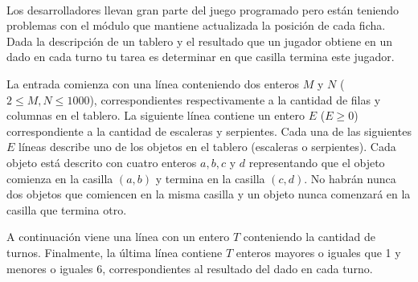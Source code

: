 \documentclass{oci}
\begin{document}
\begin{problemDescription}
  \begin{center}
    ~
  \end{center}

  Los desarrolladores llevan gran parte del juego programado pero están teniendo
  problemas con el módulo que mantiene actualizada la posición de cada ficha.
  Dada la descripción de un tablero y el resultado que un jugador obtiene en un
  dado en cada turno tu tarea es determinar en que casilla termina este jugador.
\end{problemDescription}

\begin{inputDescription}
  La entrada comienza con una línea conteniendo dos enteros $M$ y $N$ ($2 \leq
  M, N \leq 1000$), correspondientes respectivamente a la cantidad de filas y
  columnas en el tablero.
  La siguiente línea contiene un entero $E$ ($E \geq 0$) correspondiente a la
  cantidad de escaleras y serpientes.
  Cada una de las siguientes $E$ líneas describe uno de los objetos en el
  tablero (escaleras o serpientes).
  Cada objeto está descrito con cuatro enteros $a, b, c$ y $d$ representando que
  el objeto comienza en la casilla $(a, b)$ y termina en la casilla $(c, d)$.
  No habrán nunca dos objetos que comiencen en la misma casilla y un objeto
  nunca comenzará en la casilla que termina otro.

  A continuación viene una línea con un entero $T$ conteniendo la cantidad de
  turnos.
  Finalmente, la última línea contiene $T$ enteros mayores o iguales que 1 y
  menores o iguales 6, correspondientes al resultado del dado en cada turno.
\end{inputDescription}
\end{document}
